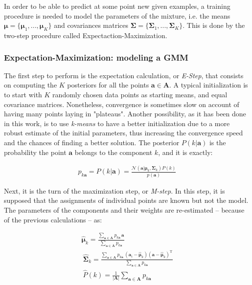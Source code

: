 \documentclass[10pt,twocolumn,letterpaper]{article}
\begin{document}
In order to be able to predict at some point new given examples, a training procedure is needed to model the parameters of the mixture, i.e. the means $\boldsymbol{\mu} = \{ \mathbf{\boldsymbol{\mu}}_1, ..., \boldsymbol{\mu}_K \}$ and covariances matrices $\mathbf{\Sigma} = \{ \mathbf{\Sigma}_1, ..., \mathbf{\Sigma}_K \}$. This is done by the two-step procedure called Expectaction-Maximization.

\subsubsection{Expectation-Maximization: modeling a GMM}


The first step to perform is the expectation calculation, or \emph{E-Step}, that consists on computing the $K$ posteriors for all the points $\mathbf{a} \in \mathbf{A}$.  A typical initialization is to start with $K$ randomly chosen data points as starting means, and equal covariance matrices. Nonetheless, convergence is sometimes slow on account of having many points laying in "plateaus". Another possibility, as it has been done in this work, is to use \emph{k-means} to have a better initialization due to a more robust estimate of the initial parameters, thus increasing the convergence speed and the chances of finding a better solution. The posterior $P(k|\mathbf{a})$ is the probability the point $\mathbf{a}$ belongs to the component $k$, and it is exactly:

\begin{gather}
	p_{k\mathbf{a}} = P(k|\mathbf{a}) = \frac{\mathcal{N}(\mathbf{a}|\boldsymbol{\mu}_{k}, \mathbf{\Sigma}_{k}) P(k)}{p(\mathbf{a})}
\end{gather}

Next, it is the turn of the maximization step, or \emph{M-step}. In this step, it is supposed that the assignments of individual points are known but not the model. The parameters of the components and their weights are re-estimated -- because of the previous calculations -- as:

\begin{gather}
	\hat{\boldsymbol{\mu}}_k = \frac{\sum_{\mathbf{a} \in \mathbf{A}} p_{k\mathbf{a}} \, \mathbf{a}}{\sum_{\mathbf{a} \in \mathbf{A}} p_{k\mathbf{a}}} \\
	~
	\hat{\mathbf{\Sigma}}_k = \frac{\sum_{\mathbf{a} \in \mathbf{A}} p_{k\mathbf{a}} \, (\mathbf{a}_i - \hat{\boldsymbol{\mu}}_k)(\mathbf{a} - \hat{\boldsymbol{\mu}}_k)^{\mathrm{T}} }{\sum_{\mathbf{a} \in \mathbf{A}} p_{k\mathbf{a}}}\\
	~
	\hat{P}(k) = \frac{1}{|\mathbf{A}|} \sum_{\mathbf{a} \in \mathbf{A}} p_{k\mathbf{a}}
\end{gather}
\end{document}
